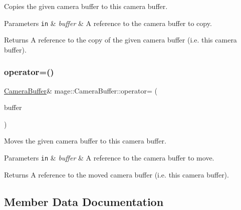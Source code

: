 Copies the given camera buffer to this camera buffer.


\begin{DoxyParams}[1]{Parameters}
\mbox{\tt in}  & {\em buffer} & A reference to the camera buffer to copy. \\
\hline
\end{DoxyParams}
\begin{DoxyReturn}{Returns}
A reference to the copy of the given camera buffer (i.\+e. this camera buffer). 
\end{DoxyReturn}
\hypertarget{structmage_1_1_camera_buffer_a901081932ab76c9bdfacb0814e821190}{}\label{structmage_1_1_camera_buffer_a901081932ab76c9bdfacb0814e821190} 
\subsubsection{\texorpdfstring{operator=()}{operator=()}\hspace{0.1cm}{\footnotesize\ttfamily [2/2]}}
{\footnotesize\ttfamily \hyperlink{structmage_1_1_camera_buffer}{Camera\+Buffer}\& mage\+::\+Camera\+Buffer\+::operator= (\begin{DoxyParamCaption}\item[{\hyperlink{structmage_1_1_camera_buffer}{Camera\+Buffer} \&\&}]{buffer }\end{DoxyParamCaption})\hspace{0.3cm}{\ttfamily [default]}}

Moves the given camera buffer to this camera buffer.


\begin{DoxyParams}[1]{Parameters}
\mbox{\tt in}  & {\em buffer} & A reference to the camera buffer to move. \\
\hline
\end{DoxyParams}
\begin{DoxyReturn}{Returns}
A reference to the moved camera buffer (i.\+e. this camera buffer). 
\end{DoxyReturn}


\subsection{Member Data Documentation}
\hypertarget{structmage_1_1_camera_buffer_a5ecb7ec90a7bc1900846d53488315d33}{}\label{structmage_1_1_camera_buffer_a5ecb7ec90a7bc1900846d53488315d33} 
